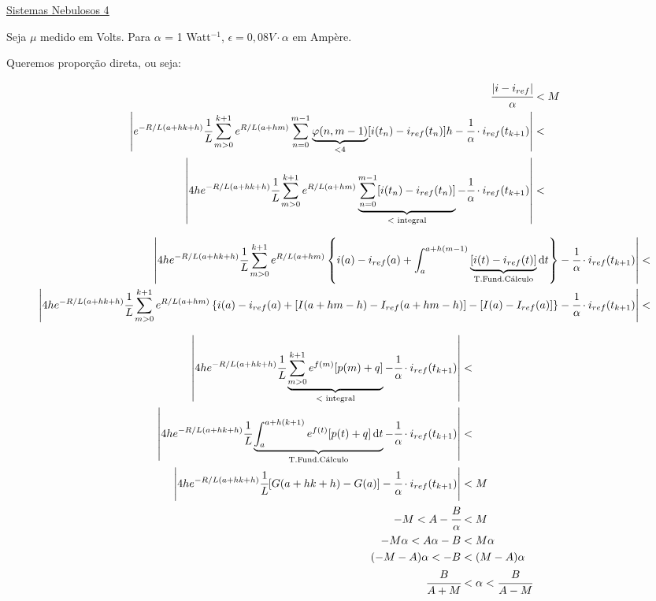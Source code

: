 \documentclass[10pt]{article}
\begin{document}
\Large

\begin{center}
\href{https://www.youtube.com/watch?v=2E0TYW42x1c}{\color{blue}\underline{Sistemas Nebulosos 4}}
\end{center}

\normalsize

Seja $\mu$ medido em Volts. Para $\alpha$ = 1 Watt$^{-1}$, $\epsilon = 0,08V \cdot \alpha$ em Amp\`ere.

Queremos propor\c{c}\~ao direta, ou seja:

\begin{align}
  \cfrac{|i - i_{ref}|}{\alpha} &< M \\
  \left\vert e^{-R/L (a + hk + h)}\cfrac{1}{L}\sum_{m > 0}^{k + 1} e^{R/L (a + hm)}  \sum_{n = 0}^{m - 1} \underbrace{\varphi(n,m-1)}_{<4} [i(t_n) - i_{ref}(t_n)] h - \cfrac{1}{\alpha} \cdot i_{ref}(t_{k+1}) \right\vert &<  \\
  \left\vert 4h e^{-R/L (a + hk + h)}\cfrac{1}{L}\sum_{m > 0}^{k + 1} e^{R/L (a + hm)}  \underbrace{\sum_{n = 0}^{m - 1} [i(t_n) - i_{ref}(t_n)]}_{<\text{ integral}} - \cfrac{1}{\alpha} \cdot i_{ref}(t_{k+1}) \right\vert &<
\end{align}

\footnotesize

\begin{align}
  \left\vert 4h e^{-R/L (a + hk + h)}\cfrac{1}{L}\sum_{m > 0}^{k + 1} e^{R/L (a + hm)}  \left\{ i(a) - i_{ref}(a) + \int_a^{a + h(m - 1)} \underbrace{[i(t) - i_{ref}(t)]}_{\text{T.Fund.C\'alculo}} \mathrm{d}t \right\} - \cfrac{1}{\alpha} \cdot i_{ref}(t_{k+1}) \right\vert &<  \\
  \left\vert 4h e^{-R/L (a + hk + h)}\cfrac{1}{L}\sum_{m > 0}^{k + 1} e^{R/L (a + hm)}  \left\{ i(a) - i_{ref}(a) + [I(a + hm - h) - I_{ref}(a + hm - h)] - [I(a) - I_{ref}(a)] \right\} - \cfrac{1}{\alpha} \cdot i_{ref}(t_{k+1}) \right\vert &<
\end{align}

\normalsize

\begin{align}
  \left\vert 4h e^{-R/L (a + hk + h)}\cfrac{1}{L} \underbrace{\sum_{m > 0}^{k + 1} e^{f(m)} [p(m) + q]}_{<\text{ integral}}  - \cfrac{1}{\alpha} \cdot i_{ref}(t_{k+1}) \right\vert &<  \\
  \left\vert 4h e^{-R/L (a + hk + h)}\cfrac{1}{L} \underbrace{\int_a^{a + h(k + 1)} e^{f(t)} [p(t) + q] \,\mathrm{d}t}_{\text{T.Fund.C\'alculo}}  - \cfrac{1}{\alpha} \cdot i_{ref}(t_{k+1}) \right\vert &<  \\
  \left\vert 4h e^{-R/L (a + hk + h)}\cfrac{1}{L} [G(a + hk + h) - G(a)]  - \cfrac{1}{\alpha} \cdot i_{ref}(t_{k+1}) \right\vert &< M \\
  - M < A - \cfrac{B}{\alpha} &< M \\
  - M\alpha < A\alpha - B &< M \alpha \\
  (- M - A)\alpha < - B &< (M - A) \alpha \\
  \cfrac{B}{A + M} &< \alpha < \cfrac{B}{A - M}
\end{align}
\end{document}
